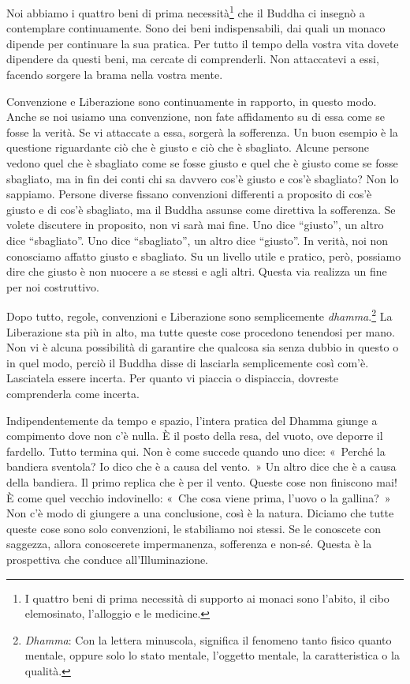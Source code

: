 Noi abbiamo i quattro beni di prima necessità\footnote{I quattro beni di
  prima necessità di supporto ai monaci sono l'abito, il cibo
  elemosinato, l'alloggio e le medicine.} che il Buddha ci insegnò a
contemplare continuamente. Sono dei beni indispensabili, dai quali un
monaco dipende per continuare la sua pratica. Per tutto il tempo della
vostra vita dovete dipendere da questi beni, ma cercate di comprenderli.
Non attaccatevi a essi, facendo sorgere la brama nella vostra mente.

Convenzione e Liberazione sono continuamente in rapporto, in questo
modo. Anche se noi usiamo una convenzione, non fate affidamento su di
essa come se fosse la verità. Se vi attaccate a essa, sorgerà la
sofferenza. Un buon esempio è la questione riguardante ciò che è giusto
e ciò che è sbagliato. Alcune persone vedono quel che è sbagliato come
se fosse giusto e quel che è giusto come se fosse sbagliato, ma in fin
dei conti chi sa davvero cos'è giusto e cos'è sbagliato? Non lo
sappiamo. Persone diverse fissano convenzioni differenti a proposito di
cos'è giusto e di cos'è sbagliato, ma il Buddha assunse come direttiva
la sofferenza. Se volete discutere in proposito, non vi sarà mai fine.
Uno dice ``giusto'', un altro dice ``sbagliato''. Uno dice
``sbagliato'', un altro dice ``giusto''. In verità, noi non conosciamo
affatto giusto e sbagliato. Su un livello utile e pratico, però,
possiamo dire che giusto è non nuocere a se stessi e agli altri. Questa
via realizza un fine per noi costruttivo.

Dopo tutto, regole, convenzioni e Liberazione sono semplicemente
\emph{dhamma}.\footnote{\emph{Dhamma}: Con la lettera minuscola,
  significa il fenomeno tanto fisico quanto mentale, oppure solo lo
  stato mentale, l'oggetto mentale, la caratteristica o la qualità.}
La Liberazione sta più in alto, ma tutte queste cose procedono tenendosi
per mano. Non vi è alcuna possibilità di garantire che qualcosa sia
senza dubbio in questo o in quel modo, perciò il Buddha disse di
lasciarla semplicemente così com'è. Lasciatela essere incerta. Per
quanto vi piaccia o dispiaccia, dovreste comprenderla come incerta.

Indipendentemente da tempo e spazio, l'intera pratica del Dhamma giunge
a compimento dove non c'è nulla. È il posto della resa, del vuoto, ove
deporre il fardello. Tutto termina qui. Non è come succede quando uno
dice: «~Perché la bandiera sventola? Io dico che è a causa del vento.~»
Un altro dice che è a causa della bandiera. Il primo replica che è per
il vento. Queste cose non finiscono mai! È come quel vecchio
indovinello: «~Che cosa viene prima, l'uovo o la gallina?~» Non c'è modo
di giungere a una conclusione, così è la natura. Diciamo che tutte
queste cose sono solo convenzioni, le stabiliamo noi stessi. Se le
conoscete con saggezza, allora conoscerete impermanenza, sofferenza e
non-sé. Questa è la prospettiva che conduce all'Illuminazione.

